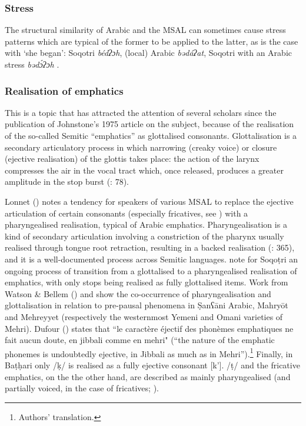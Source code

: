 \documentclass[output=paper]{langsci/langscibook}
\begin{document}
 \subsubsection{Stress}

The structural similarity of Arabic and the MSAL can sometimes cause stress patterns which are typical of the former to be applied to the latter, as is the case with `she began': Soqotri \textit{bédʔɔh}, (local) Arabic \textit{bədáʔat}, Soqotri with an Arabic stress \textit{bədɔ́ʔɔh} \citep[299]{Lonnet2011}.


 \subsubsection{Realisation of emphatics}\label{sec:key:emph}

This is a topic that has attracted the attention of several scholars since the publication of Johnstone’s 1975 article on the subject, because of the realisation of the so-called Semitic “emphatics” as glottalised consonants. Glottalisation is a secondary articulatory process in which narrowing (creaky voice) or closure (ejective realisation) of the glottis takes place: the action of the larynx compresses the air in the vocal tract which, once released, produces a greater amplitude in the stop burst (\citealt{LadefogedMaddieson1996}: 78). 

Lonnet (\citeyear[299]{Lonnet2011}) notes a tendency for speakers of various MSAL to replace the ejective articulation of certain consonants (especially fricatives, see \citealt{RidouaneGendrot2017}) with a pharyngealised realisation, typical of Arabic emphatics. Pharyngealisation is a kind of secondary articulation involving a constriction of the pharynx usually realised through tongue root retraction, resulting in a backed realisation (\citealt{LadefogedMaddieson1996}: 365), and it is a well-documented process across Semitic languages. \citet{NaumkinPorkhomovsky1981} note for Soqoṭri an ongoing process of transition from a glottalised to a pharyngealised realisation of emphatics, with only stops being realised as fully glottalised items. Work from Watson \& Bellem (\citeyear{WatsonBellem2010,WatsonBellem2011}) and \citet{WatsonHeselwood2016} show the co-occurrence of pharyngealisation and glottalisation in relation to pre-pausal phenomena in \d{S}anʕāni Arabic, Mahryōt and Mehreyyet (respectively the westernmost Yemeni and Omani varieties of Mehri). Dufour (\citeyear[22]{Dufour2016}) states that ``le caractère éjectif des phonèmes emphatiques ne fait aucun doute, en jibbali comme en mehri" (“the nature of the emphatic phonemes is undoubtedly ejective, in Jibbali as much as in Mehri”).\footnote{Authors' translation.} Finally, in Baṭḥari only /ḳ/ is realised as a fully ejective consonant [k’]. /ṭ/ and the fricative emphatics, on the the other hand, are described as mainly pharyngealised (and partially voiced, in the case of fricatives; \citealt{Gasparini2017}).
\end{document}
